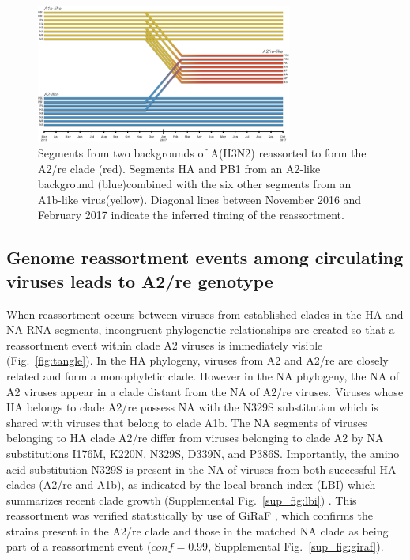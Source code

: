 \begin{figure}[t]
    \begin{center}
    \includegraphics[width=0.75\textwidth]{figures/railroad_plot.png}
    \end{center}
    \caption{Segments from two backgrounds of A(H3N2) reassorted to form the A2/re clade (red). Segments HA and PB1 from an A2-like background (blue)combined with the six other segments from an A1b-like virus(yellow). Diagonal lines between November 2016 and February 2017 indicate the inferred timing of the reassortment.}
    \label{fig:railroad}
\end{figure}

\subsection*{Genome reassortment events among circulating viruses leads to A2/re genotype}
When reassortment occurs between viruses from established clades in the HA and NA RNA segments, incongruent phylogenetic relationships are created so that a reassortment event within clade A2 viruses is immediately visible (Fig.~\ref{fig:tangle}).
In the HA phylogeny, viruses from A2 and A2/re are closely related and form a monophyletic clade.
However in the NA phylogeny, the NA of A2 viruses appear in a clade distant from the NA of A2/re viruses.
Viruses whose HA belongs to clade A2/re possess NA with the N329S substitution which is shared with viruses that belong to clade A1b.
The NA segments of viruses belonging to HA clade A2/re differ from viruses belonging to clade A2 by NA substitutions I176M, K220N, N329S, D339N, and P386S.
Importantly, the amino acid substitution N329S is present in the NA of viruses from both successful HA clades (A2/re and A1b), as indicated by the local branch index (LBI) which summarizes recent clade growth (Supplemental Fig.~\ref{sup_fig:lbi}) \citep{neher_predicting_2014}.
This reassortment was verified statistically by use of GiRaF \citep{nagarajan_2010}, which confirms the strains present in the A2/re clade and those in the matched NA clade as being part of a reassortment event ($conf = 0.99$, Supplemental Fig.~\ref{sup_fig:giraf}).

